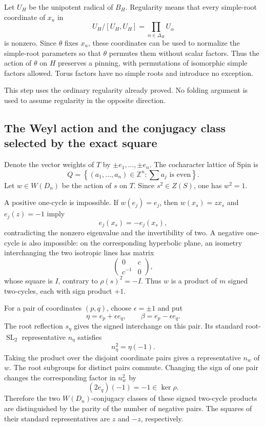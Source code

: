\documentclass[11pt,a4paper]{article}
\theoremstyle{definition}
\theoremstyle{remark}
\begin{document}
Let \(U_H\) be the unipotent radical of \(B_H\). Regularity means that
every simple-root coordinate of \(x_u\) in
\[
U_H/[U_H,U_H]
=\prod_{\alpha\in\Delta_H}U_\alpha
\]
is nonzero. Since \(\theta\) fixes \(x_u\), these coordinates can be
used to normalize the simple-root parameters so that \(\theta\)
permutes them without scalar factors. Thus the action of \(\theta\)
on \(H\) preserves a pinning, with permutations of isomorphic simple
factors allowed. Torus factors have no simple roots and introduce no
exception.

This step uses the ordinary regularity already proved. No folding
argument is used to assume regularity in the opposite direction.

\subsection{The Weyl action and the conjugacy class selected by the exact square}

Denote the vector weights of \(T\) by
\(\pm e_1,\ldots,\pm e_n\). The cocharacter lattice of Spin is
\[
Q=
\left\{
(a_1,\ldots,a_n)\in\mathbb Z^n:
\sum a_j\text{ is even}
\right\}.
\]
Let \(w\in W(D_n)\) be the action of \(s\) on \(T\). Since
\(s^2\in Z(S)\), one has \(w^2=1\).

A positive one-cycle is impossible. If \(w(e_j)=e_j\), then
\(w(x_s)=zx_s\) and \(e_j(z)=-1\) imply
\[
e_j(x_s)=-e_j(x_s),
\]
contradicting the nonzero eigenvalue and the invertibility of two.
A negative one-cycle is also impossible: on the corresponding
hyperbolic plane, an isometry interchanging the two isotropic lines has
matrix
\[
\begin{pmatrix}0&c\\ c^{-1}&0\end{pmatrix},
\]
whose square is \(I\), contrary to \(\rho(s)^2=-I\).
Thus \(w\) is a product of \(m\) signed two-cycles, each with sign
product \(+1\).

For a pair of coordinates \((p,q)\), choose \(\epsilon=\pm1\) and put
\[
\eta=e_p+\epsilon e_q,
\qquad
\beta=e_p-\epsilon e_q.
\]
The root reflection \(s_\eta\) gives the signed interchange on this
pair. Its standard root-\(\operatorname{SL}_2\) representative
\(n_\eta\) satisfies
\[
n_\eta^2=\eta(-1).
\]
Taking the product over the disjoint coordinate pairs gives a
representative \(n_w\) of \(w\). The root subgroups for distinct pairs
commute. Changing the sign of one pair changes the corresponding
factor in \(n_w^2\) by
\[
(2e_q)(-1)=-1\in\ker\rho.
\]
Therefore the two \(W(D_n)\)-conjugacy classes of these signed
two-cycle products are distinguished by the parity of the number of
negative pairs. The squares of their standard representatives are
\(z\) and \(-z\), respectively.
\end{document}
